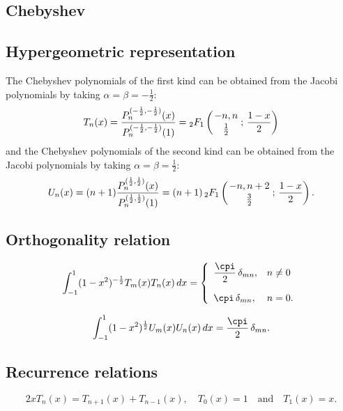 \documentclass[envcountchap,graybox]{svmono}
\newcounter{rom}
\newcommand{\hyp}[5]{\mbox{}_{#1}{F}_{#2}
\left(\genfrac{}{}{0pt}{}{#3}{#4}\,;\,#5\right)}
\begin{document}
\subsection{Chebyshev}

\par

\subsection*{Hypergeometric representation}
The Chebyshev polynomials of the first kind can be obtained from the Jacobi
polynomials by taking $\alpha=\beta=-\frac{1}{2}$:
\begin{equation}
\label{DefChebyshevI}
T_n(x)=\frac{P_n^{(-\frac{1}{2},-\frac{1}{2})}(x)}{P_n^{(-\frac{1}{2},-\frac{1}{2})}(1)}
=\hyp{2}{1}{-n,n}{\frac{1}{2}}{\frac{1-x}{2}}
\end{equation}
and the Chebyshev polynomials of the second kind can be obtained from the
Jacobi polynomials by taking $\alpha=\beta=\frac{1}{2}$:
\begin{equation}
\label{DefChebyshevII}
U_n(x)=(n+1)\frac{P_n^{(\frac{1}{2},\frac{1}{2})}(x)}{P_n^{(\frac{1}{2},\frac{1}{2})}(1)}
=(n+1)\,\hyp{2}{1}{-n,n+2}{\frac{3}{2}}{\frac{1-x}{2}}.
\end{equation}

\subsection*{Orthogonality relation}
\begin{equation}
\label{OrtChebyshevI}
\int_{-1}^1(1-x^2)^{-\frac{1}{2}}T_m(x)T_n(x)\,dx=
\left\{\begin{array}{ll}
\displaystyle\frac{\cpi}{2}\,\delta_{mn}, & n\neq 0\\[5mm]
\cpi\,\delta_{mn}, & n=0.
\end{array}\right.
\end{equation}

\begin{equation}
\label{OrtChebyshevII}
\int_{-1}^1(1-x^2)^{\frac{1}{2}}U_m(x)U_n(x)\,dx=\frac{\cpi}{2}\,\delta_{mn}.
\end{equation}

\subsection*{Recurrence relations}
\begin{equation}
\label{RecChebyshevI}
2xT_n(x)=T_{n+1}(x)+T_{n-1}(x),\quad T_{0}(x)=1\quad\textrm{and}\quad T_1(x)=x.
\end{equation}
\end{document}
